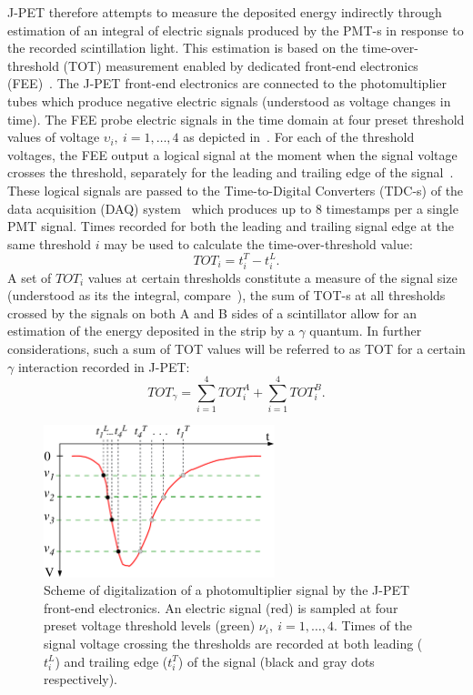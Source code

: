 J-PET therefore attempts to measure the deposited energy indirectly through estimation of an integral of electric signals produced by the PMT-s in response to the recorded scintillation light. This estimation is based on the time-over-threshold (TOT) measurement enabled by dedicated front-end electronics (FEE)~\cite{marek_fee}. The J-PET front-end electronics are connected to the photomultiplier tubes which produce negative electric signals (understood as voltage changes in time). The FEE probe electric signals in the time domain at four preset threshold values of voltage $\upsilon_i, \: i=1,\ldots,4$ as depicted in~. For each of the threshold voltages, the FEE output a logical signal at the moment when the signal voltage crosses the threshold, separately for the leading and trailing edge of the signal~\cite{marek_fee}. These logical signals are passed to the Time-to-Digital Converters (TDC-s) of the data acquisition (DAQ) system~\cite{greg_daq} which produces up to 8 timestamps per a single PMT signal. Times recorded for both the leading and trailing signal edge at the same threshold $i$ may be used to calculate the time-over-threshold value:
\begin{equation}
  \label{eq:tot_i}
  TOT_i = t^T_i-t^L_i.
\end{equation}
A set of $TOT_i$ values at certain thresholds constitute a measure of the signal size (understood as its the integral, compare~), the sum of TOT-s at all thresholds crossed by the signals on both A and B sides of a scintillator allow for an estimation of the energy deposited in the strip by a $\gamma$ quantum. In further considerations, such a sum of TOT values will be referred to as TOT for a certain $\gamma$ interaction recorded in J-PET:
\begin{equation}
  \label{eq:tot_def}
  TOT_{\gamma} = \sum_{i=1}^4 TOT_i^{A} + \sum_{i=1}^4 TOT_i^{B}.
\end{equation}

\begin{figure}[h!]
  \centering
  \includegraphics[width=0.6\textwidth]{Chapter3_detectors/img/jpet_sig2}
  \caption{Scheme of digitalization of a photomultiplier signal by the J-PET front-end electronics. An electric signal (red) is sampled at four preset voltage threshold levels
(green) $\nu_{i}, \ i=1,\ldots,4$. Times of the signal voltage crossing the thresholds are recorded at both leading ($t_i^{L}$) and trailing edge ($t_i^{T}$) of the signal (black and gray dots respectively).}\label{fig:jpet_signal}
\end{figure}


